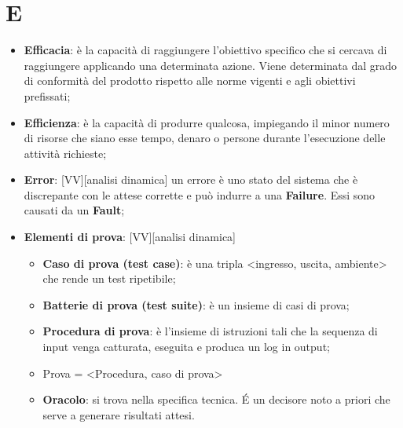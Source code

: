 % 
%
% 
%

\section{E}

\begin{itemize}
	\item \textbf{Efficacia}: è la capacità di raggiungere l'obiettivo specifico che si cercava di raggiungere applicando una determinata azione. \newline
Viene determinata dal grado di conformità del prodotto rispetto alle norme vigenti e agli obiettivi prefissati;

	\item \textbf{Efficienza}: è la capacità di produrre qualcosa, impiegando il minor numero di risorse che siano esse tempo, denaro o persone durante l'esecuzione delle attività richieste; \newline

	\item \textbf{Error}: [VV][analisi dinamica] un errore è uno stato del sistema che è discrepante con le attese corrette e può indurre a una \textbf{Failure}. Essi sono causati da un \textbf{Fault};

	\item \textbf{Elementi di prova}: [VV][analisi dinamica]
		\begin{itemize}
			\item \textbf{Caso di prova (test case)}: è una tripla <ingresso, uscita, ambiente> che rende un test ripetibile;
			\item \textbf{Batterie di prova (test suite)}: è un insieme di casi di prova;
			\item \textbf{Procedura di prova}: è l'insieme di istruzioni tali che la sequenza di input venga catturata, eseguita e produca un log in output;
			\item Prova = <Procedura, caso di prova>
			\item \textbf{Oracolo}: si trova nella specifica tecnica. \'E un decisore noto a priori che serve a generare risultati attesi.
		\end{itemize}
\end{itemize}